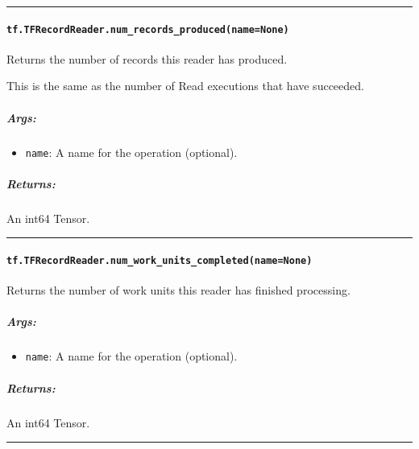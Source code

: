 \begin{center}\rule{0.5\linewidth}{\linethickness}\end{center}

\paragraph{\texorpdfstring{\texttt{tf.TFRecordReader.num\_records\_produced(name=None)}
}{tf.TFRecordReader.num\_records\_produced(name=None) }}\label{tf.tfrecordreader.numux5frecordsux5fproducednamenone}

Returns the number of records this reader has produced.

This is the same as the number of Read executions that have succeeded.

\subparagraph{Args: }\label{args-30}

\begin{itemize}
\tightlist
\item
  \texttt{name}: A name for the operation (optional).
\end{itemize}

\subparagraph{Returns: }\label{returns-25}

An int64 Tensor.

\begin{center}\rule{0.5\linewidth}{\linethickness}\end{center}

\paragraph{\texorpdfstring{\texttt{tf.TFRecordReader.num\_work\_units\_completed(name=None)}
}{tf.TFRecordReader.num\_work\_units\_completed(name=None) }}\label{tf.tfrecordreader.numux5fworkux5funitsux5fcompletednamenone}

Returns the number of work units this reader has finished processing.

\subparagraph{Args: }\label{args-31}

\begin{itemize}
\tightlist
\item
  \texttt{name}: A name for the operation (optional).
\end{itemize}

\subparagraph{Returns: }\label{returns-26}

An int64 Tensor.

\begin{center}\rule{0.5\linewidth}{\linethickness}\end{center}

